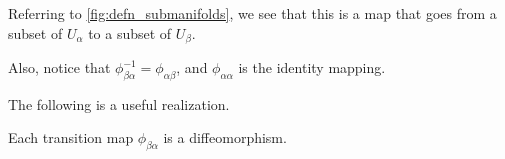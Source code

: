 \documentclass[notoc,notitlepage]{tufte-book}
\begin{document}
\begin{note}
  Referring to \cref{fig:defn_submanifolds}, we see that this is a map that goes
  from a subset of $U_\alpha$ to a subset of $U_\beta$.

  Also, notice that $\phi_{\beta \alpha}^{-1} = \phi_{\alpha \beta}$, and
  $\phi_{\alpha \alpha}$ is the identity mapping.
\end{note}

The following is a useful realization.

\begin{propo}\label{propo:transition_maps_are_diffeomorphisms}
  Each transition map $\phi_{\beta \alpha}$ is a diffeomorphism.
\end{propo}

\end{document}
